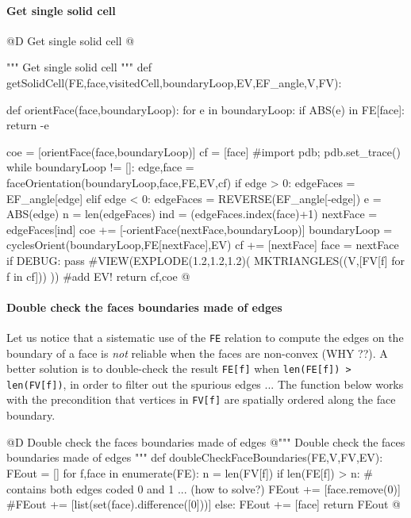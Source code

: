 \documentclass[11pt,oneside]{article}    %
\begin{document}
\paragraph{Get single solid cell}

@D Get single solid cell
@{""" Get single solid cell """
def getSolidCell(FE,face,visitedCell,boundaryLoop,EV,EF_angle,V,FV):

    def orientFace(face,boundaryLoop): 
        for e in boundaryLoop:
            if ABS(e) in FE[face]: return -e

    coe = [orientFace(face,boundaryLoop)]
    cf = [face] 
    #import pdb; pdb.set_trace()
    while boundaryLoop != []:
        edge,face = faceOrientation(boundaryLoop,face,FE,EV,cf)
        if edge > 0: edgeFaces = EF_angle[edge]
        elif edge < 0: edgeFaces = REVERSE(EF_angle[-edge])
        e = ABS(edge)
        n = len(edgeFaces)
        ind = (edgeFaces.index(face)+1)%
        nextFace = edgeFaces[ind]
        coe += [-orientFace(nextFace,boundaryLoop)]
        boundaryLoop = cyclesOrient(boundaryLoop,FE[nextFace],EV)
        cf += [nextFace] 
        face = nextFace
    if DEBUG: pass
        #VIEW(EXPLODE(1.2,1.2,1.2)( MKTRIANGLES((V,[FV[f] for f in cf])) )) #add EV!
    return cf,coe
@}

\paragraph{Double check the faces boundaries made of edges}
Let us notice that a sistematic use of the \texttt{FE} relation to compute the edges on the boundary of a face is \emph{not} reliable when the faces are non-convex (WHY ??). A better solution is to double-check the result \texttt{FE[f]} when \texttt{len(FE[f]) > len(FV[f])}, in order to filter out the spurious edges ...
The function below works with the precondition that vertices in \texttt{FV[f]} are spatially ordered along the face boundary.

@D Double check the faces boundaries made of edges
@{""" Double check the faces boundaries made of edges """
def doubleCheckFaceBoundaries(FE,V,FV,EV):
    FEout = []
    for f,face in enumerate(FE):
        n = len(FV[f])
        if len(FE[f]) > n:
            # contains both edges coded 0 and 1 ... (how to solve?)
            FEout += [face.remove(0)]
            #FEout += [list(set(face).difference([0]))]
        else:
            FEout += [face]
    return FEout
@}
\end{document}
